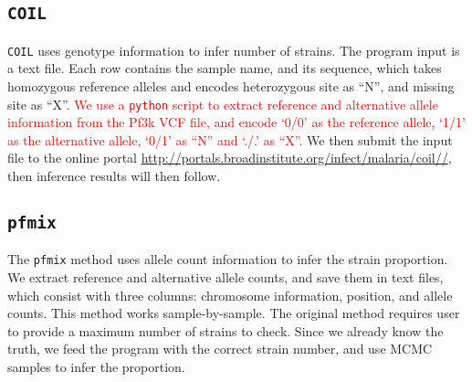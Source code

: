 \documentclass{article}
\begin{document}
\subsection{\texttt{COIL}}
\texttt{COIL} uses genotype information to infer number of strains. The program input is a text file. Each row contains the sample name, and its sequence, which takes homozygous reference alleles and encodes heterozygous site as ``N'', and missing site as ``X''. \textcolor{red}{We use a \texttt{python} script to extract reference and alternative allele information from the Pf3k VCF file, and encode `0/0' as the reference allele, `1/1' as the alternative allele, `0/1' as ``N'' and `./.' as ``X''.} We then submit the input file to the online portal \url{http://portals.broadinstitute.org/infect/malaria/coil//}, then inference results will then follow.

\subsection{\texttt{pfmix}}
The \texttt{pfmix} method uses allele count information to infer the strain proportion. We extract reference and alternative allele counts, and save them in text files, which consist with three columns: chromosome information, position, and allele counts. This method works sample-by-sample. The original method requires user to provide a maximum number of strains to check. Since we already know the truth, we feed the program with the correct strain number, and use MCMC samples to infer the proportion.
\end{document}
